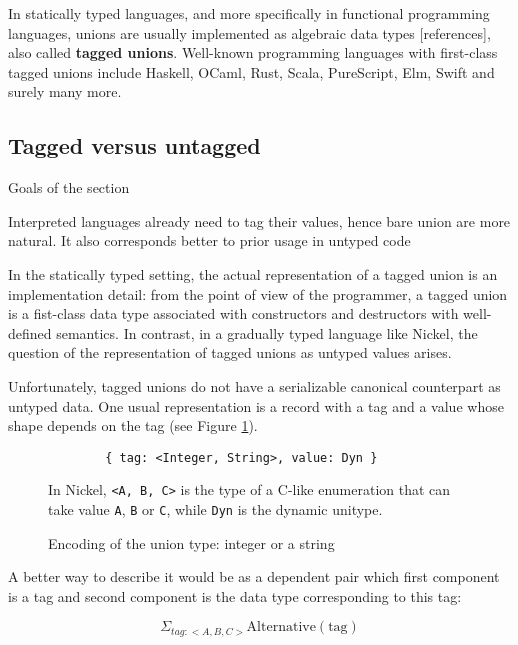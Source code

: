 \documentclass{article}
\begin{document}
In statically typed languages, and more specifically in functional programming
languages, unions are usually implemented as algebraic data types [references],
also called \textbf{tagged unions}. Well-known programming languages with
first-class tagged unions include Haskell, OCaml, Rust, Scala, PureScript, Elm,
Swift and surely many more.

\subsection{Tagged versus untagged}
\color{red}Goals of the section

Interpreted languages already need to tag their values, hence bare union are more natural.
It also corresponds better to prior usage in untyped code\vspace{0.5cm}\color{black}

In the statically typed setting, the actual representation of a tagged union is
an implementation detail: from the point of view of the programmer, a tagged
union is a fist-class data type associated with constructors and destructors
with well-defined semantics. In contrast, in a gradually typed language like
Nickel, the question of the representation of tagged unions as untyped values
arises.

Unfortunately, tagged unions do not have a serializable canonical counterpart as
untyped data. One usual representation is a record with a tag and a value whose
shape depends on the tag (see Figure \ref{fig:union-encoding}).

\begin{figure}
  \begin{center}
    \begin{lstlisting}
        { tag: <Integer, String>, value: Dyn }
    \end{lstlisting}
  \end{center}
\caption{Encoding of the union type: integer or a string}
\label{fig:union-encoding}
\medskip
\small
In Nickel, \lstinline+<A, B, C>+ is the type of a C-like enumeration that can
take value \lstinline+A+, \lstinline+B+ or \lstinline+C+, while \lstinline+Dyn+
is the dynamic unitype.
\end{figure}

A better way to describe it would be as a dependent pair which first component
is a tag and second component is the data type corresponding to this tag:

\[
    \Sigma_{tag : <A, B, C>} \text{Alternative}(\text{tag})
\]
\end{document}
